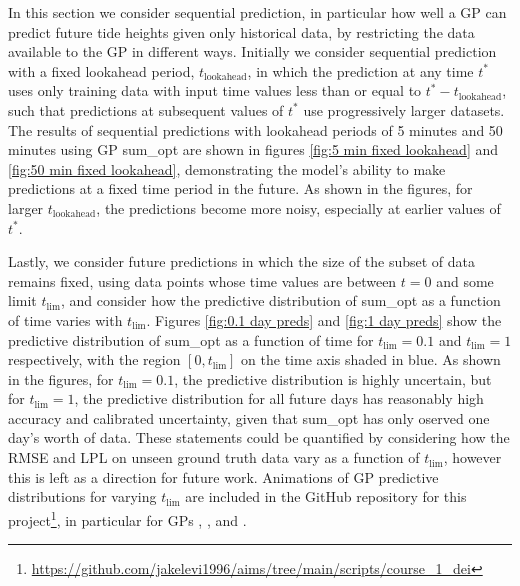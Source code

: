 In this section we consider sequential prediction, in particular how well a GP can predict future tide heights given only historical data, by restricting the data available to the GP in different ways. Initially we consider sequential prediction with a fixed lookahead period, $t_{\text{lookahead}}$, in which the prediction at any time $t^*$ uses only training data with input time values less than or equal to $t^* - t_{\text{lookahead}}$, such that predictions at subsequent values of $t^*$ use progressively larger datasets. The results of sequential predictions with lookahead periods of 5 minutes and 50 minutes using GP sum\_opt are shown in figures \ref{fig:5 min fixed lookahead} and \ref{fig:50 min fixed lookahead}, demonstrating the model's ability to make predictions at a fixed time period in the future. As shown in the figures, for larger $t_{\text{lookahead}}$, the predictions become more noisy, especially at earlier values of $t^*$.

Lastly, we consider future predictions in which the size of the subset of data remains fixed, using data points whose time values are between $t=0$ and some limit $t_\text{lim}$, and consider how the predictive distribution of sum\_opt as a function of time varies with $t_\text{lim}$. Figures \ref{fig:0.1 day preds} and \ref{fig:1 day preds} show the predictive distribution of sum\_opt as a function of time for $t_\text{lim}=0.1$ and $t_\text{lim}=1$ respectively, with the region $\left[0, t_\text{lim}\right]$ on the time axis shaded in blue. As shown in the figures, for $t_\text{lim}=0.1$, the predictive distribution is highly uncertain, but for $t_\text{lim}=1$, the predictive distribution for all future days has reasonably high accuracy and calibrated uncertainty, given that sum\_opt has only oserved one day's worth of data. These statements could be quantified by considering how the RMSE and LPL on unseen ground truth data vary as a function of  $t_\text{lim}$, however this is left as a direction for future work. Animations of GP predictive distributions for varying $t_\text{lim}$ are included in the GitHub repository for this project\footnote{\url{https://github.com/jakelevi1996/aims/tree/main/scripts/course_1_dei}}, in particular for GPs \href{https://github.com/jakelevi1996/aims/tree/main/scripts/course_1_dei#animated-sequential-predictions-for-sqe_opt}{\color{blue}{sqe\_opt}}, \href{https://github.com/jakelevi1996/aims/tree/main/scripts/course_1_dei#animated-sequential-predictions-for-prod_opt}{\color{blue}{prod\_opt}}, and \href{https://github.com/jakelevi1996/aims/tree/main/scripts/course_1_dei#animated-sequential-predictions-for-sum_opt}{\color{blue}{sum\_opt}}.
